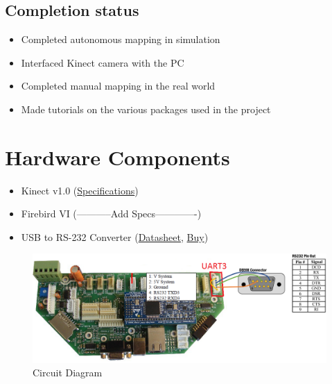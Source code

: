 \documentclass[a4paper,12pt,oneside]{book}
\begin{document}
\subsection*{Completion status}
\begin{itemize}
	\item Completed autonomous mapping in simulation
	\item Interfaced Kinect camera with the PC
	\item Completed manual mapping in the real world
	\item Made tutorials on the various packages used in the project
\end{itemize}

\section{Hardware Components}
\begin{itemize}  
  \item Kinect v1.0 (\href{https://en.wikipedia.org/wiki/Kinect#Kinect_for_Xbox_360_.28V1_2010.29}{Specifications})
  
  \item Firebird VI (-----------Add Specs-------------)
  
  \item USB to RS-232 Converter (\href{{./datasheet/USB to RS-232 Converter.pdf}}{Datasheet}, \href{http://www.nex-robotics.com/products/usb-interfacing/usb-to-rs-232-converter.html}{Buy})  	
\end{itemize}

\begin{figure}[h]
	\centering
	\includegraphics[scale=0.25]{circuit}
	\caption{Circuit Diagram}
\end{figure}
\end{document}
